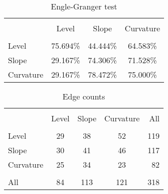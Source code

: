 \documentclass{article}
\begin{document}
\begin{table}[h]
\caption{Engle-Granger test} %
\fontsize{10}{10}\selectfont
\centering%
\begin{tabular}{l | ccc}%
\hline\hline \\ [-1.5ex]                         %

	&	Level	&	Slope	&	Curvature	\\
\hline \\ [-1.5ex]  
Level	&	75.694\%	&	44.444\%	&	64.583\%	\\
Slope	&	29.167\%	&	74.306\%	&	71.528\%	\\
Curvature	&	29.167\%	&	78.472\%	&	75.000\%	\\

\hline            
\end{tabular}
\label{table:nonlin}%
\end{table}




\begin{table}[h]
\caption{Edge counts} %
\fontsize{10}{10}\selectfont
\centering%
\begin{tabular}{l | ccc  r}%
\hline\hline \\ [-1.5ex]                         %

	&	Level	&	Slope	&	Curvature	& All  \\ 
\hline \\ [-1.5ex]  
Level	&	29	&	38	&	52	&	119 	\\
Slope	&	30	&	41	&	46	&	117	\\
Curvature	&	25	&	34	&	23	&	82	\\
\hline \\ [-1.5ex]  
All	&	84	&	113	&	121	&	318	\\


\hline            
\end{tabular}
\label{table:nonlin}%
\end{table}
\end{document}
